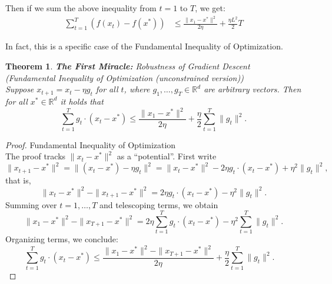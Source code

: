 \documentclass[11pt]{book} %
\newtheorem{theorem}{Theorem}[section]
\begin{document}
Then if we sum the above inequality from $t=1$ to $T$, we get:
\begin{align*}
    \sum_{t=1}^T ( f(x_t) - f(x^*) ) &\leq \frac{\|x_1 - x^*\|^2}{2 \eta} + \frac{\eta L^2}{2} T 
\end{align*}

In fact, this is a specific case of the Fundamental Inequality of Optimization. 

\begin{boxA}
    \begin{theorem}{\textbf{The First Miracle:} Robustness of Gradient Descent \\
        (Fundamental Inequality of Optimization (unconstrained version))} \\
        Suppose \( x_{t+1} = x_t - \eta g_t \) for all \( t \), where \( g_1, \ldots, g_T \in \mathbb{R}^d \) are arbitrary vectors. Then for all \( x^* \in \mathbb{R}^d \) it holds that
        \[
        \sum_{t=1}^T g_t \cdot (x_t - x^*) \leq \frac{\|x_1 - x^*\|^2}{2\eta} + \frac{\eta}{2} \sum_{t=1}^T \|g_t\|^2.
        \]
    \end{theorem}
\end{boxA}
    
\begin{proof}{Fundamental Inequality of Optimization} \\
    The proof tracks \( \|x_t - x^*\|^2 \) as a ``potential''. First write
    \[
    \|x_{t+1} - x^*\|^2 = \|(x_t - x^*) - \eta g_t\|^2 = \|x_t - x^*\|^2 - 2\eta g_t \cdot (x_t - x^*) + \eta^2 \|g_t\|^2,
    \]
    that is,
    \[
    \|x_t - x^*\|^2 - \|x_{t+1} - x^*\|^2 = 2\eta g_t \cdot (x_t - x^*) - \eta^2 \|g_t\|^2.
    \]
    Summing over \( t = 1, \ldots, T \) and telescoping terms, we obtain
    \[
    \|x_1 - x^*\|^2 - \|x_{T+1} - x^*\|^2 = 2\eta \sum_{t=1}^T g_t \cdot (x_t - x^*) - \eta^2 \sum_{t=1}^T \|g_t\|^2.
    \]
    Organizing terms, we conclude:
    \[
    \sum_{t=1}^T g_t \cdot (x_t - x^*) \leq \frac{\|x_1 - x^*\|^2 - \|x_{T+1} - x^*\|^2}{2\eta} + \frac{\eta}{2} \sum_{t=1}^T \|g_t\|^2. \quad 
    \]
\end{proof}

\bigbreak


    

\end{document}
